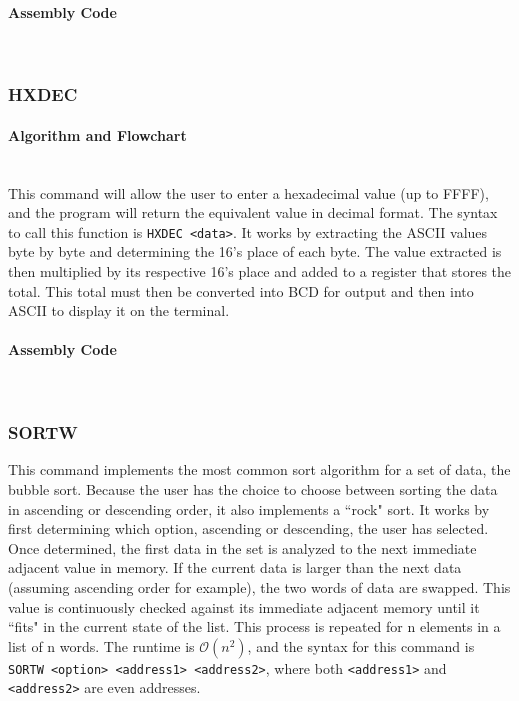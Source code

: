 \documentclass[12pt]{article}
\begin{document}
			\paragraph{Assembly Code}~\\
			
			
			\subsubsection{HXDEC}
			\paragraph{Algorithm and Flowchart}~\\
			This command will allow the user to enter a hexadecimal value (up to FFFF), and the program will return the equivalent value in decimal format. The syntax to call this function is \texttt{HXDEC <data>}. It works by extracting the ASCII values byte by byte and determining the 16's place of each byte. The value extracted is then multiplied by its respective 16's place and added to a register that stores the total. This total must then be converted into BCD for output and then into ASCII to display it on the terminal.
			\paragraph{Assembly Code}~\\
			
			
			\subsubsection{SORTW}
			This command implements the most common sort algorithm for a set of data, the bubble sort. Because the user has the choice to choose between sorting the data in ascending or descending order, it also implements a ``rock" sort. It works by first determining which option, ascending or descending, the user has selected. Once determined, the first data in the set is analyzed to the next immediate adjacent value in memory. If the current data is larger than the next data (assuming ascending order for example), the two words of data are swapped. This value is continuously checked against its immediate adjacent memory until it ``fits" in the current state of the list. This process is repeated for n elements in a list of n words. The runtime is $\mathcal{O}(n^2)$, and the syntax for this command is \texttt{SORTW <option> <address1> <address2>}, where both \texttt{<address1>} and \texttt{<address2>} are even addresses.
\end{document}
